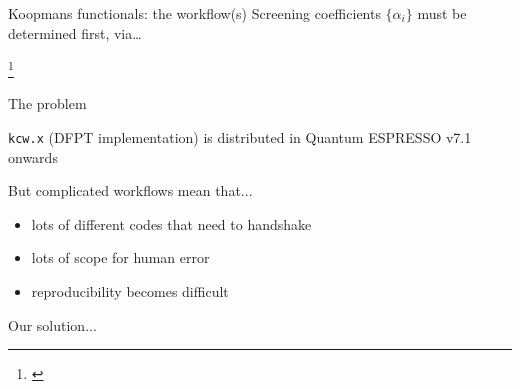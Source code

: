 \documentclass[xcolor=table,aspectratio=169]{beamer}
\newcommand\blfootcite[1]{%
  \begingroup
  \renewcommand\thefootnote{}\footnote{\hspace{-4ex}\cite{#1}}%
  \addtocounter{footnote}{-1}%
  \endgroup
}
\numberwithin{equation}{section}
\begin{document}
\begin{frame}{\small Koopmans functionals: the workflow(s)}
   \small Screening coefficients $\{\alpha_i\}$ must be determined first, via\dots

   \vspace{1ex}


   \vspace{-1.5ex}

    \blfootcite{DeGennaro2022,Colonna2022,Schubert2022}


\end{frame}

\begin{frame}{The problem}

   \texttt{kcw.x} (DFPT implementation) is distributed in Quantum ESPRESSO v7.1 onwards

   \vspace{4ex}

   But complicated workflows mean that...
   \begin{itemize}
      \item lots of different codes that need to handshake
      \item lots of scope for human error
      \item reproducibility becomes difficult
   \end{itemize}

   Our solution...

\end{frame}
\end{document}
